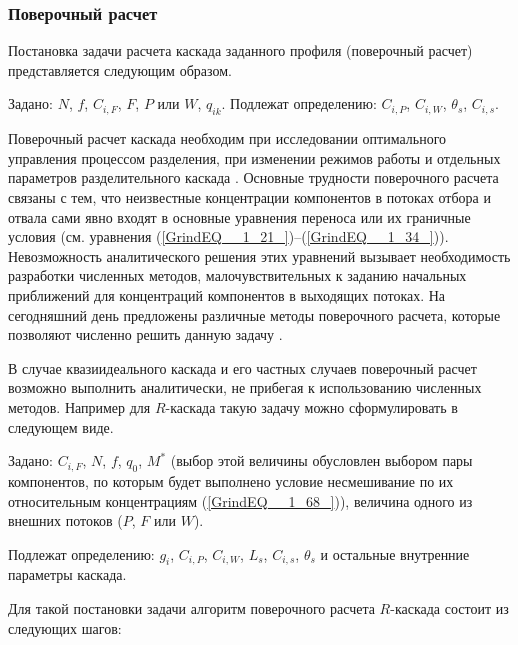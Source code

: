 \subsubsection{Поверочный расчет}
Постановка задачи расчета каскада заданного профиля (поверочный расчет) представляется следующим образом.

Задано: $N$, $f$, $C_{i,F}$, $F$, $P$ или $W$, $q_{ik}$.
Подлежат определению: $C_{i,P}$, $C_{i,W}$, $\theta_{s}$, $C_{i, s}$. 

Поверочный расчет каскада необходим при исследовании оптимального управления процессом разделения, при изменении режимов работы и отдельных параметров разделительного каскада \cite{sulaberidzeTeoriyaKaskadovDlya2011}. Основные трудности поверочного расчета связаны с тем, что неизвестные концентрации компонентов в потоках отбора и отвала сами явно входят в основные уравнения переноса или их граничные условия (см. уравнения (\ref{GrindEQ__1_21_})--(\ref{GrindEQ__1_34_})). Невозможность аналитического решения этих уравнений вызывает необходимость разработки численных методов, малочувствительных к заданию начальных приближений для концентраций компонентов в выходящих потоках. На сегодняшний день предложены различные методы поверочного расчета, которые позволяют численно решить данную задачу \cite{sulaberidzeTeoriyaKaskadovDlya2011, sazykinUsovershenstvovannyyMetodRascheta1997, wuCalculationMethodsDetermining1988, holpanovEffektivnyyMetodRascheta1998, potapovCalculationSquaredoffCascades1996, zengRobustEfficientCalculation2000}.

В случае квазиидеального каскада и его частных случаев поверочный расчет возможно выполнить аналитически, не прибегая к использованию численных методов. Например для $R$-каскада такую задачу можно сформулировать в следующем виде.

Задано: $C_{i,F}$, $N$, $f$, $q_0$, $M^{*}$ (выбор этой величины обусловлен выбором пары компонентов, по которым будет выполнено условие несмешивание по их относительным концентрациям (\ref{GrindEQ__1_68_})), величина одного из внешних потоков ($P$, $F$ или $W$).

Подлежат определению: $g_i$, $C_{i,P}$, $C_{i,W}$, $L_{s}$, $C_{i, s}$, $\theta_{s}$ и остальные внутренние параметры каскада.  

Для такой постановки задачи алгоритм поверочного расчета $R$-каскада состоит из следующих шагов:

